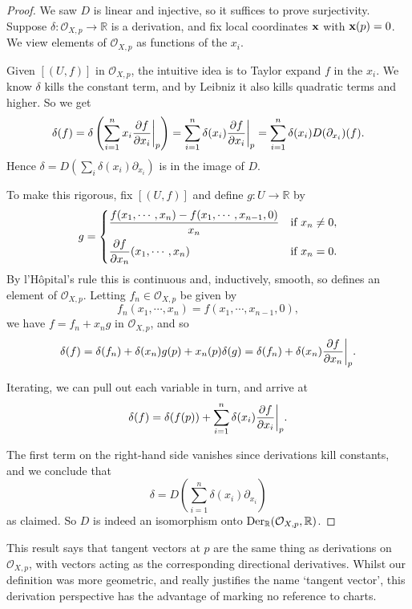 \documentclass[a4paper,11pt]{article}
\begin{document}
	\begin{proof}
		We saw $D$ is linear and injective, so it suffices to prove surjectivity. Suppose $\delta : \mathcal{O}_{X,p} \to \mathbb{R}$ is a derivation, and fix local coordinates $\vb x$ with $\vb x(p) = 0$. We view elements of $\mathcal{O}_{X,p}$ as functions of the $x_i$.

		Given $[(U,f)]$ in $\mathcal{O}_{X,p}$, the intuitive idea is to Taylor expand $f$ in the $x_i$. We know $\delta$ kills the constant term, and by Leibniz it also kills quadratic terms and higher. So we get
		\[
			\delta(f) = \delta \left( \sum_{i = 1}^n x_i \pdv{f}{x_i}\bigg|_{p} \right) = \sum_{i=1}^n \delta(x_i) \pdv{f}{x_i}\bigg|_{p} = \sum_{i=1}^n \delta(x_i) D(\partial_{x_i})(f).
		\]
		Hence $\delta = D(\sum_i \delta(x_i) \partial_{x_i})$ is in the image of $D$.

		To make this rigorous, fix $[(U,f)]$ and define $g : U \to \mathbb{R}$ by
		\[
			g = \begin{dcases}
				\frac{f(x_1,\cdots,x_n) - f(x_1,\cdots,x_{n-1},0)}{x_n} & \text{if }x_n \neq 0,\\
				\pdv{f}{x_n}\/(x_1, \cdots, x_n) & \text{if }x_n = 0.
			\end{dcases}
		\]
		By l'H\^opital's rule this is continuous and, inductively, smooth, so defines an element of $\mathcal{O}_{X,p}$. Letting $f_n \in \mathcal{O}_{X,p}$ be given by
		\[
			f_n (x_1, \cdots, x_n) = f(x_1, \cdots, x_{n-1}, 0),
		\]
		we have $f = f_n + x_n g$ in $\mathcal{O}_{X,p}$, and so
		\[
			\delta(f) = \delta (f_n) + \delta (x_n) g(p) + x_n (p) \delta (g) = \delta(f_n) + \delta(x_n) \pdv{f}{x_n}\bigg|_{p}.
		\]

		Iterating, we can pull out each variable in turn, and arrive at
		\[
			\delta(f) = \delta(f(p)) + \sum_{i = 1}^n \delta(x_i) \pdv{f}{x_i}\bigg|_{p}.
		\]
		
		The first term on the right-hand side vanishes since derivations kill constants, and we conclude that
		\[
			\delta = D \left( \sum_{i = 1}^n \delta(x_i) \partial_{x_i} \right)
		\]
		as claimed. So $D$ is indeed an isomorphism onto $\operatorname{Der}_{\mathbb{R}}(\mathcal{O}_{X,p},\mathbb{R})$.
	\end{proof}

	This result says that tangent vectors at $p$ are the same thing as derivations on $\mathcal{O}_{X,p}$, with vectors acting as the corresponding directional derivatives. Whilst our definition was more geometric, and really justifies the name `tangent vector', this derivation perspective has the advantage of marking no reference to charts.
\end{document}
